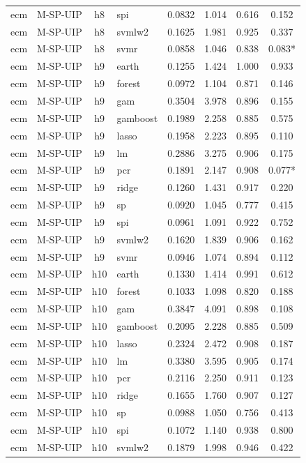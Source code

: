 \begin{ThreePartTable}
\begin{longtable}[t]{llclcccc}
ecm & M-SP-UIP & h8 & spi & 0.0832 & 1.014 & 0.616 & 0.152\\
ecm & M-SP-UIP & h8 & svmlw2 & 0.1625 & 1.981 & 0.925 & 0.337\\
ecm & M-SP-UIP & h8 & svmr & 0.0858 & 1.046 & 0.838 & 0.083*\\
\addlinespace
ecm & M-SP-UIP & h9 & earth & 0.1255 & 1.424 & 1.000 & 0.933\\
ecm & M-SP-UIP & h9 & forest & 0.0972 & 1.104 & 0.871 & 0.146\\
ecm & M-SP-UIP & h9 & gam & 0.3504 & 3.978 & 0.896 & 0.155\\
ecm & M-SP-UIP & h9 & gamboost & 0.1989 & 2.258 & 0.885 & 0.575\\
ecm & M-SP-UIP & h9 & lasso & 0.1958 & 2.223 & 0.895 & 0.110\\
ecm & M-SP-UIP & h9 & lm & 0.2886 & 3.275 & 0.906 & 0.175\\
ecm & M-SP-UIP & h9 & pcr & 0.1891 & 2.147 & 0.908 & 0.077*\\
ecm & M-SP-UIP & h9 & ridge & 0.1260 & 1.431 & 0.917 & 0.220\\
ecm & M-SP-UIP & h9 & sp & 0.0920 & 1.045 & 0.777 & 0.415\\
ecm & M-SP-UIP & h9 & spi & 0.0961 & 1.091 & 0.922 & 0.752\\
ecm & M-SP-UIP & h9 & svmlw2 & 0.1620 & 1.839 & 0.906 & 0.162\\
ecm & M-SP-UIP & h9 & svmr & 0.0946 & 1.074 & 0.894 & 0.112\\
\addlinespace
ecm & M-SP-UIP & h10 & earth & 0.1330 & 1.414 & 0.991 & 0.612\\
ecm & M-SP-UIP & h10 & forest & 0.1033 & 1.098 & 0.820 & 0.188\\
ecm & M-SP-UIP & h10 & gam & 0.3847 & 4.091 & 0.898 & 0.108\\
ecm & M-SP-UIP & h10 & gamboost & 0.2095 & 2.228 & 0.885 & 0.509\\
ecm & M-SP-UIP & h10 & lasso & 0.2324 & 2.472 & 0.908 & 0.187\\
ecm & M-SP-UIP & h10 & lm & 0.3380 & 3.595 & 0.905 & 0.174\\
ecm & M-SP-UIP & h10 & pcr & 0.2116 & 2.250 & 0.911 & 0.123\\
ecm & M-SP-UIP & h10 & ridge & 0.1655 & 1.760 & 0.907 & 0.127\\
ecm & M-SP-UIP & h10 & sp & 0.0988 & 1.050 & 0.756 & 0.413\\
ecm & M-SP-UIP & h10 & spi & 0.1072 & 1.140 & 0.938 & 0.800\\
ecm & M-SP-UIP & h10 & svmlw2 & 0.1879 & 1.998 & 0.946 & 0.422\\

\end{longtable}
\end{ThreePartTable}
